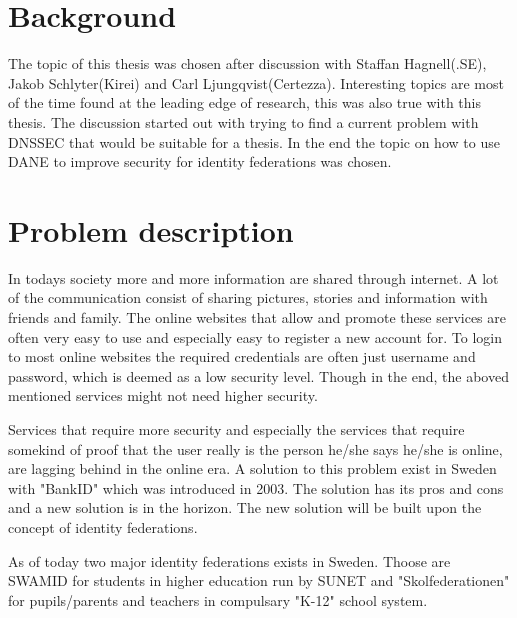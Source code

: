 \section{Background}
The topic of this thesis was chosen after discussion with Staffan Hagnell(.SE), Jakob Schlyter(Kirei) and Carl Ljungqvist(Certezza).
Interesting topics are most of the time found at the leading edge of research, this was also true with this thesis.
The discussion started out with trying to find a current problem with DNSSEC that would be suitable for a thesis.
In the end the topic on how to use DANE to improve security for identity federations was chosen.

\section{Problem description}
In todays society more and more information are shared through internet.
A lot of the communication consist of sharing pictures, stories and information with friends and family.
The online websites that allow and promote these services are often very easy to use and especially easy to register a new account for.
To login to most online websites the required credentials are often just username and password, which is deemed as a low security level.
Though in the end, the aboved mentioned services might not need higher security.

Services that require more security and especially the services that require somekind of proof that the user really is the person he/she says he/she is online, are lagging behind in the online era.
A solution to this problem exist in Sweden with "BankID" which was introduced in 2003\cite{website:bankid-about}.
The solution has its pros and cons and a new solution is in the horizon.
The new solution will be built upon the concept of identity federations.

As of today two major identity federations exists in Sweden.
Thoose are SWAMID for students in higher education run by SUNET and "Skolfederationen" for pupils/parents and teachers in compulsary "K-12" school system.



